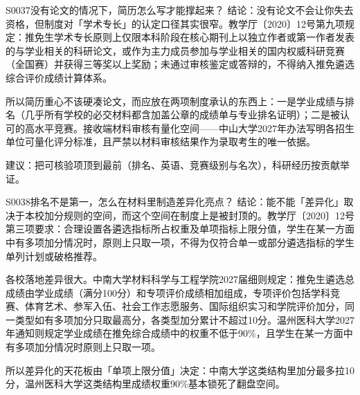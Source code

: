 \begin{qa}{S0037}{没有论文的情况下，简历怎么写才能撑起来？}
结论：没有论文不会让你失去资格，但制度对「学术专长」的认定口径其实很窄。教学厅〔2020〕12号第九项规定：推免生学术专长原则上仅限本科阶段在核心期刊上以独立作者或第一作者发表的与学业相关的科研论文，或作为主力成员参加与学业相关的国内权威科研竞赛（全国赛）并获得三等奖以上奖励；未通过审核鉴定或答辩的，不得纳入推免遴选综合评价成绩计算体系。

所以简历重心不该硬凑论文，而应放在两项制度承认的东西上：一是学业成绩与排名（几乎所有学校的必交材料都含加盖公章的成绩单与专业排名证明）；二是被认可的高水平竞赛。接收端材料审核有量化空间——中山大学2027年办法写明各招生单位可量化评分标准，且严禁以材料审核结果作为录取考生的唯一依据。

建议：把可核验项顶到最前（排名、英语、竞赛级别与名次），科研经历按贡献举证。
\end{qa}

\begin{qa}{S0038}{排名不是第一，怎么在材料里制造差异化亮点？}
结论：能不能「差异化」取决于本校加分规则的空间，而这个空间在制度上是被封顶的。教学厅〔2020〕12号第三项要求：合理设置各遴选指标所占权重及单项指标上限分值，学生在某一方面中有多项加分情况时，原则上只取一项，不得为仅符合单一或部分遴选指标的学生单列计划或破格推荐。

各校落地差异很大。中南大学材料科学与工程学院2027届细则规定：推免生遴选总成绩由学业成绩（满分100分）和专项评价成绩相加组成，专项评价包括学科竞赛、体育艺术、参军入伍、社会工作志愿服务、国际组织实习和学院评价加分，同一类型如有多项加分只取最高分，各类型加分累计不超过10分。温州医科大学2027年通知则规定学业成绩在推免综合成绩中的权重不低于90\%，且学生在某一方面中有多项加分情况时原则上只取一项。

所以差异化的天花板由「单项上限分值」决定：中南大学这类结构里加分最多拉10分，温州医科大学这类结构里成绩权重90\%基本锁死了翻盘空间。
\end{qa}

